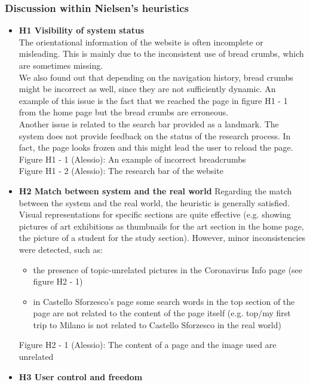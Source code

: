 \subsubsection{Discussion within Nielsen's heuristics}
\begin{itemize}
    \item \textbf{H1 Visibility of system status}\\
        The orientational information of the website is often incomplete or misleading. This is mainly due to the inconsistent use of bread crumbs, which are sometimes missing.\\
        We also found out that depending on the navigation history, bread crumbs might be incorrect as well, since they are not sufficiently dynamic. An example of this issue is the fact that we reached the page in figure H1 - 1 from the home page but the bread crumbs are erroneous.\\
        Another issue is related to the search bar provided as a landmark. The system does not provide feedback on the status of the research process. In fact, the page looks frozen and this might lead the user to reload the page.\\
        Figure H1 - 1 (Alessio): An example of incorrect breadcrumbs\\
        Figure H1 - 2 (Alessio): The research bar of the website
    \item \textbf{H2 Match between system and the real world}
        Regarding the match between the system and the real world, the heuristic is generally satisfied. Visual representations for specific sections are quite effective (e.g. showing pictures of art exhibitions as thumbnails for the art section in the home page, the picture of a student for the study section). However, minor inconsistencies were detected, such as:
        \begin{itemize}
            \item the presence of topic-unrelated pictures in the Coronavirus Info page (see figure H2 - 1)
            \item in Castello Sforzesco's page some search words in the top section of the page are not related to the content of the page itself (e.g. top/my first trip to Milano is not related to Castello Sforzesco in the real world)
        \end{itemize}
        Figure H2 - 1 (Alessio): The content of a page and the image used are unrelated
    \item \textbf{H3 User control and freedom}\\

\end{itemize}
